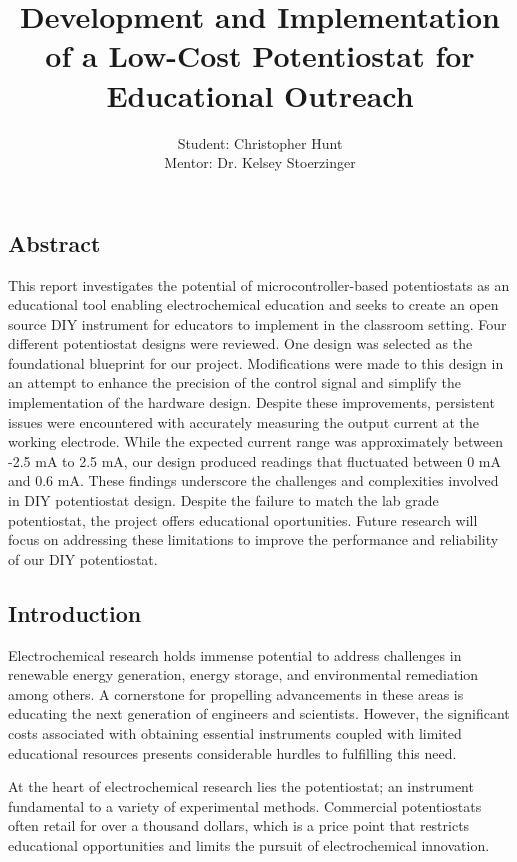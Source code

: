 \documentclass{article}
\title{\textcolor{mycolor}{\textbf{{\huge Development and Implementation of a Low-Cost Potentiostat for Educational Outreach}}}}
\author{Student: Christopher Hunt \\ Mentor: Dr. Kelsey Stoerzinger}
\date{}
\begin{document}
\pagestyle{fancy}
\fancyhf{}
\rfoot{}
\rhead{\thepage}
\maketitle


\subsection*{Abstract}
This report investigates the potential of microcontroller-based potentiostats as an educational tool enabling electrochemical education and seeks to create an open source DIY instrument for educators to implement in the classroom setting. Four different potentiostat designs were reviewed. One design was selected as the foundational blueprint for our project. Modifications were made to this design in an attempt to enhance the precision of the control signal and simplify the implementation of the hardware design. Despite these improvements, persistent issues were encountered with accurately measuring the output current at the working electrode. While the expected current range was approximately between -2.5 mA to 2.5 mA, our design produced readings that fluctuated between 0 mA and 0.6 mA. These findings underscore the challenges and complexities involved in DIY potentiostat design. Despite the failure to match the lab grade potentiostat, the project offers educational oportunities. Future research will focus on addressing these limitations to improve the performance and reliability of our DIY potentiostat.


\subsection*{Introduction}
Electrochemical research holds immense potential to address challenges in renewable energy generation, energy storage, and environmental remediation among others. A cornerstone for propelling advancements in these areas is educating the next generation of engineers and scientists. However, the significant costs associated with obtaining essential instruments coupled with limited educational resources presents considerable hurdles to fulfilling this need.


At the heart of electrochemical research lies the potentiostat; an instrument fundamental to a variety of experimental methods. Commercial potentiostats often retail for over a thousand dollars, which is a price point that restricts educational opportunities and limits the pursuit of electrochemical innovation.
\end{document}
